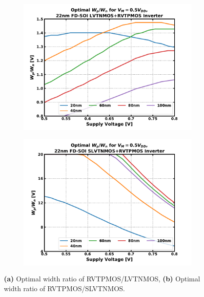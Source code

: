 			\begin{figure}[htb!]
			    \centering
			    \begin{subfigure}{0.5\textwidth}
			        \centering
			        \includegraphics[width=1\textwidth, angle=0]{./figs/design/lvtnfet_pfet}
			        \caption{ }
			        \label{fig:ratio_lvtn_p}
			    \end{subfigure}%
			    \begin{subfigure}{0.5\textwidth}
			        \centering
			        \includegraphics[width=1\textwidth, angle=0]{./figs/design/slvtnfet_pfet}
			        \caption{ }
			        \label{fig:ratio_slvtn_p}
			    \end{subfigure}
			    \caption{\textbf{(a)} Optimal width ratio of RVTPMOS/LVTNMOS, \textbf{(b)} Optimal width ratio of RVTPMOS/SLVTNMOS.}
			    \label{fig:opt_ratio}
			\end{figure} 


